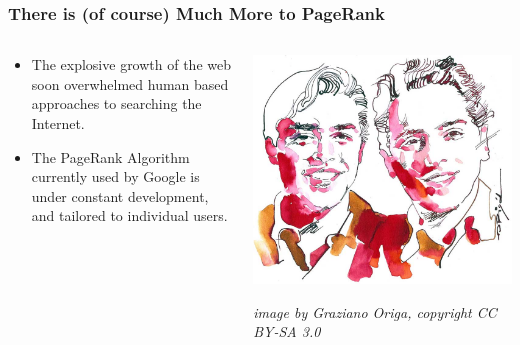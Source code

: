 \begin{frame}
\frametitle{There is (of course) Much More to PageRank}

\begin{columns}
\begin{column}{.55\textwidth}

\begin{itemize}
    \item The explosive growth of the web soon overwhelmed human based approaches to searching the Internet. 
    \item The PageRank Algorithm currently used by Google is under constant development, and tailored to individual users. 
\end{itemize}

\end{column}\begin{column}{.4\textwidth}
\begin{center}
        \includegraphics[width=1.0\textwidth]{Chapter5/images/PageBrin.jpg} 
        \begin{center}
        \vspace{-8pt}
    {\tiny
    \textit{image by Graziano Origa, copyright CC BY-SA 3.0}
    }
    \end{center}
\end{center}


\end{column}
\end{columns}
    

\end{frame}


